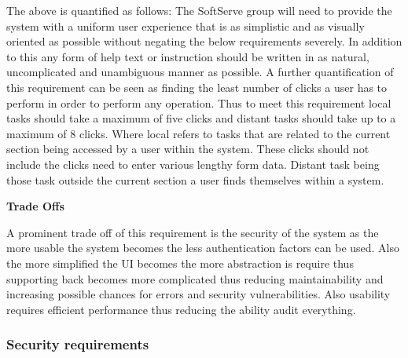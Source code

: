 \begin{flushleft}
\begin{itemize}
\end{itemize}

The above is quantified as follows: The SoftServe group will need to provide the system with a uniform user experience that is as simplistic and as visually oriented as possible without negating the below requirements severely. In addition to this any form of help text or instruction should be written in as natural, uncomplicated and unambiguous manner as possible. A further quantification of this requirement can be seen as finding the least number of clicks a user has to perform in order to perform any operation. Thus to meet this requirement local tasks should take a maximum of five clicks and distant tasks should take up to a maximum of 8 clicks. Where local refers to tasks that are related to the current section being accessed by a user within the system. These clicks should not include the clicks need to enter various lengthy form data. Distant task being those task outside the current section a user finds themselves within a system.
 
\vspace{0.1in}

\textbf{Trade Offs}

A prominent trade off of this requirement is the security of the system as the more usable the system becomes the less authentication factors can be used. Also the more simplified the UI becomes the more abstraction is require thus supporting back becomes more complicated thus reducing maintainability and increasing possible chances for errors and security vulnerabilities. Also usability requires efficient performance thus reducing the ability audit everything.
\end{flushleft}

\subsubsection{Security requirements}

